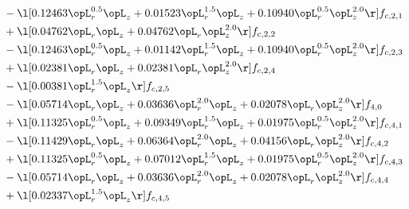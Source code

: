 \begin{alignat}{2}
& - \l[  0.12463 \opL_r^{0.5} \opL_z +  0.01523 \opL_r^{1.5} \opL_z +  0.10940 \opL_r^{0.5} \opL_z^{2.0}  \r] f_{c,2,1} \nonumber \\ 
& + \l[  0.04762 \opL_r \opL_z +  0.04762 \opL_r \opL_z^{2.0}  \r] f_{c,2,2} \nonumber \\ 
& - \l[  0.12463 \opL_r^{0.5} \opL_z +  0.01142 \opL_r^{1.5} \opL_z +  0.10940 \opL_r^{0.5} \opL_z^{2.0}  \r] f_{c,2,3} \nonumber \\ 
& + \l[  0.02381 \opL_r \opL_z +  0.02381 \opL_r \opL_z^{2.0}  \r] f_{c,2,4} \nonumber \\ 
& - \l[  0.00381 \opL_r^{1.5} \opL_z  \r] f_{c,2,5} \nonumber \\ 
& - \l[  0.05714 \opL_r \opL_z +  0.03636 \opL_r^{2.0} \opL_z +  0.02078 \opL_r \opL_z^{2.0}  \r] f_{4,0} \nonumber \\ 
& + \l[  0.11325 \opL_r^{0.5} \opL_z +  0.09349 \opL_r^{1.5} \opL_z +  0.01975 \opL_r^{0.5} \opL_z^{2.0}  \r] f_{c,4,1} \nonumber \\ 
& - \l[  0.11429 \opL_r \opL_z +  0.06364 \opL_r^{2.0} \opL_z +  0.04156 \opL_r \opL_z^{2.0}  \r] f_{c,4,2} \nonumber \\ 
& + \l[  0.11325 \opL_r^{0.5} \opL_z +  0.07012 \opL_r^{1.5} \opL_z +  0.01975 \opL_r^{0.5} \opL_z^{2.0}  \r] f_{c,4,3} \nonumber \\ 
& - \l[  0.05714 \opL_r \opL_z +  0.03636 \opL_r^{2.0} \opL_z +  0.02078 \opL_r \opL_z^{2.0}  \r] f_{c,4,4} \nonumber \\ 
& + \l[  0.02337 \opL_r^{1.5} \opL_z  \r] f_{c,4,5} \nonumber \\ 
\end{alignat} 



